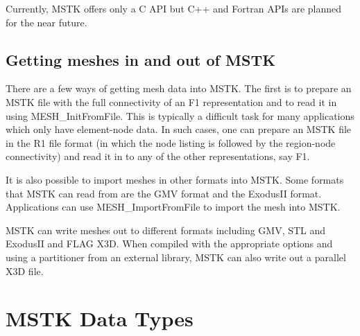 \documentclass[12pt]{article}
\begin{document}
Currently, MSTK offers only a C API but C++ and Fortran APIs are
planned for the near future.


\subsection{Getting meshes in and out of MSTK}

There are a few ways of getting mesh data into MSTK. The first is to
prepare an MSTK file with the full connectivity of an F1
representation and to read it in using MESH\_InitFromFile. This is
typically a difficult task for many applications which only have
element-node data. In such cases, one can prepare an MSTK file in the
R1 file format (in which the node listing is followed by the
region-node connectivity) and read it in to any of the other
representations, say F1. 

It is also possible to import meshes in other formats into MSTK. Some
formats that MSTK can read from are the GMV format and the ExodusII
format. Applications can use MESH\_ImportFromFile to import the mesh
into MSTK.

MSTK can write meshes out to different formats including GMV, STL and
ExodusII and FLAG X3D. When compiled with the appropriate options and
using a partitioner from an external library, MSTK can also write out
a parallel X3D file.

\newpage
\section{MSTK Data Types}
\end{document}

